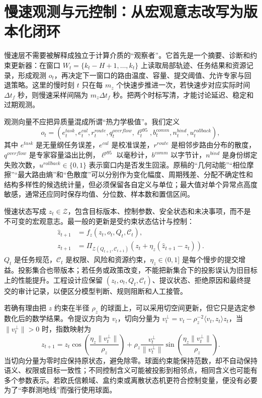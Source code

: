 \section{慢速观测与元控制：从宏观意志改写为版本化闭环}
\label{sec:appendix_macro_observer}

慢速层不需要被解释成独立于计算介质的“观察者”。它首先是一个摘要、诊断和约束更新器：在窗口 $W_t=\{k_t-H+1,\ldots,k_t\}$ 上读取局部轨迹、任务结果和资源记录，形成观测 $o_t$，再决定下一窗口的路由温度、容量、提交阈值、允许专家与回退策略。这里的慢时刻 $t$ 只在每 $m_z$ 个快速步推进一次，若快速步对应实际时间 $\Delta t_f$ 秒，则慢速采样间隔为 $m_z\Delta t_f$ 秒。把两个时标写清，才能讨论延迟、稳定和过期观测。

观测向量不应把异质量混成所谓“热力学极值”。我们定义
\begin{equation}
o_t=(e^{task}_t,e^{cal}_t,r^{route}_t,q^{overflow}_t,
\ell^{p95}_t,b^{comm}_t,n^{bind}_t,u^{rollback}_t),
\end{equation}
其中 $e^{task}$ 是无量纲任务误差，$e^{cal}$ 是校准误差，$r^{route}$ 是相邻步路由分布的散度，$q^{overflow}$ 是专家容量溢出比例，$\ell^{p95}$ 以毫秒计，$b^{comm}$ 以字节计，$n^{bind}$ 是身份绑定失败次数，$u^{rollback}\in\{0,1\}$ 表示窗口内是否发生回滚。原稿的“几何动能”“相位摩擦”“最大路由熵”和“色散度”可以分别作为变化幅度、周期残差、分配不确定性和结构多样性的候选统计量，但必须保留各自定义与单位；最大值对单个异常点高度敏感，通常还应同时保存均值、分位数、样本数和置信区间。

慢速状态写成 $z_t\in\mathcal Z$，包含目标版本、控制参数、安全状态和未决事项，而不是不可变的宏观意志。最一般的更新是受约束状态估计与控制：
\begin{align}
\hat z_{t+1}&=f_z(z_t,o_t,Q_t,\mathcal C_t),\\
z_{t+1}&=\Pi_{\mathcal Z(Q_{t+1},\mathcal C_{t+1})}
\left(z_t+\eta_z(\hat z_{t+1}-z_t)\right).
\end{align}
$Q_t$ 是任务规范，$\mathcal C_t$ 是权限、风险和资源约束，$\eta_z\in(0,1]$ 是每个慢步的提交增益。投影集合也带版本；若任务或政策改变，不能把新集合下的投影误认为旧目标上的性能提升。工程设计应保留 $(z_t,o_t,Q_t,\mathcal C_t)$、提议状态、拒绝原因和最终提交的审计记录，以便区分模型判断、规则阻断和人工接管。

若确有理由把 $z$ 约束在半径 $\rho_z$ 的球面上，可以采用切空间更新，但它只是选定参数化后的数学结果。令提议方向为 $v_t$，切向分量为 $v_t^\perp=v_t-\rho_z^{-2}\langle v_t,z_t\rangle z_t$，当 $\lVert v_t^\perp\rVert>0$ 时，指数映射为
\begin{equation}
z_{t+1}=z_t\cos\!\left(\frac{\eta_z\lVert v_t^\perp\rVert}{\rho_z}\right)
+\rho_z\frac{v_t^\perp}{\lVert v_t^\perp\rVert}
\sin\!\left(\frac{\eta_z\lVert v_t^\perp\rVert}{\rho_z}\right).
\end{equation}
当切向分量为零时应保持原状态，避免除零。球面约束能保持范数，却不自动保持语义、权限或目标一致性；不同控制含义可能被投影到相邻点，相同含义也可能有多个参数表示。若欧氏信赖域、盒约束或离散状态机更符合控制变量，便没有必要为了“李群测地线”而强行使用球面。

